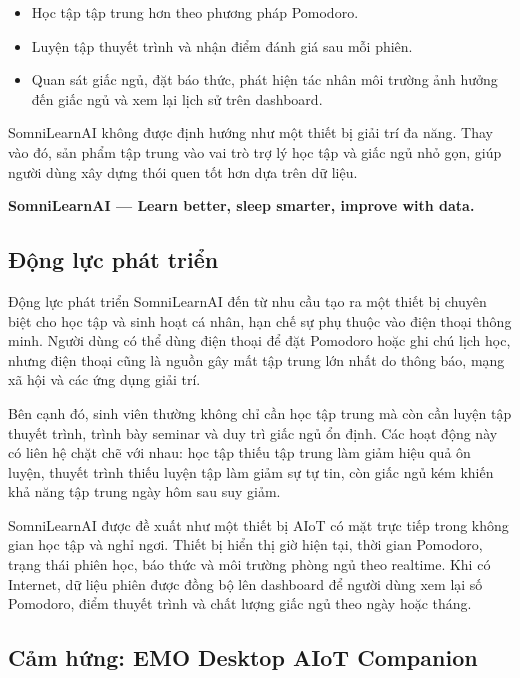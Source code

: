 \documentclass[12pt,a4paper]{article}
\begin{document}
\begin{itemize}
    \item Học tập tập trung hơn theo phương pháp Pomodoro.
    \item Luyện tập thuyết trình và nhận điểm đánh giá sau mỗi phiên.
    \item Quan sát giấc ngủ, đặt báo thức, phát hiện tác nhân môi trường ảnh hưởng đến giấc ngủ và xem lại lịch sử trên dashboard.
\end{itemize}

SomniLearnAI không được định hướng như một thiết bị giải trí đa năng. Thay vào đó, sản phẩm tập trung vào vai trò trợ lý học tập và giấc ngủ nhỏ gọn, giúp người dùng xây dựng thói quen tốt hơn dựa trên dữ liệu.

\begin{center}
\textbf{SomniLearnAI --- Learn better, sleep smarter, improve with data.}
\end{center}

\subsection{Động lực phát triển}

Động lực phát triển SomniLearnAI đến từ nhu cầu tạo ra một thiết bị chuyên biệt cho học tập và sinh hoạt cá nhân, hạn chế sự phụ thuộc vào điện thoại thông minh. Người dùng có thể dùng điện thoại để đặt Pomodoro hoặc ghi chú lịch học, nhưng điện thoại cũng là nguồn gây mất tập trung lớn nhất do thông báo, mạng xã hội và các ứng dụng giải trí.

Bên cạnh đó, sinh viên thường không chỉ cần học tập trung mà còn cần luyện tập thuyết trình, trình bày seminar và duy trì giấc ngủ ổn định. Các hoạt động này có liên hệ chặt chẽ với nhau: học tập thiếu tập trung làm giảm hiệu quả ôn luyện, thuyết trình thiếu luyện tập làm giảm sự tự tin, còn giấc ngủ kém khiến khả năng tập trung ngày hôm sau suy giảm.

SomniLearnAI được đề xuất như một thiết bị AIoT có mặt trực tiếp trong không gian học tập và nghỉ ngơi. Thiết bị hiển thị giờ hiện tại, thời gian Pomodoro, trạng thái phiên học, báo thức và môi trường phòng ngủ theo realtime. Khi có Internet, dữ liệu phiên được đồng bộ lên dashboard để người dùng xem lại số Pomodoro, điểm thuyết trình và chất lượng giấc ngủ theo ngày hoặc tháng.

\subsection{Cảm hứng: EMO Desktop AIoT Companion}
\end{document}
